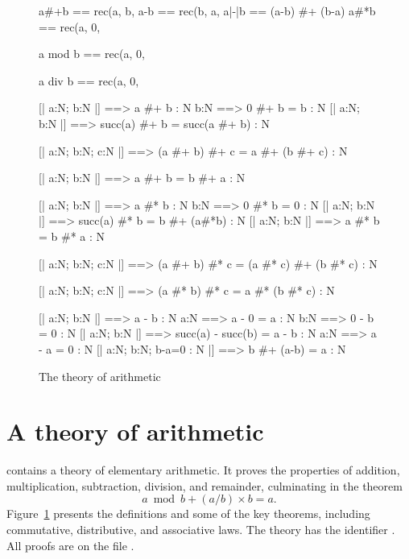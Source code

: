 \begin{figure} 
\begin{ttbox}
           a#+b  == rec(a, b, %
          a-b   == rec(b, a, %
       a|-|b == (a-b) #+ (b-a)  
          a#*b  == rec(a, 0, %

   a mod b == rec(a, 0,

   a div b == rec(a, 0,
\end{ttbox}

\begin{ttbox}
        [| a:N;  b:N |] ==> a #+ b : N
             b:N ==> 0 #+ b = b : N
         [| a:N;  b:N |] ==> succ(a) #+ b = succ(a #+ b) : N

         [| a:N;  b:N;  c:N |] ==> 
                  (a #+ b) #+ c = a #+ (b #+ c) : N

       [| a:N;  b:N |] ==> a #+ b = b #+ a : N

       [| a:N;  b:N |] ==> a #* b : N
            b:N ==> 0 #* b = 0 : N
        [| a:N;  b:N |] ==> succ(a) #* b = b #+ (a#*b) : N
      [| a:N;  b:N |] ==> a #* b = b #* a : N

     [| a:N;  b:N;  c:N |] ==> 
                  (a #+ b) #* c = (a #* c) #+ (b #* c) : N

        [| a:N;  b:N;  c:N |] ==> 
                  (a #* b) #* c = a #* (b #* c) : N

       [| a:N;  b:N |] ==> a - b : N
            a:N ==> a - 0 = a : N
       b:N ==> 0 - b = 0 : N
    [| a:N;  b:N |] ==> succ(a) - succ(b) = a - b : N
    a:N ==> a - a = 0 : N
  [| a:N;  b:N;  b-a=0 : N |] ==> b #+ (a-b) = a : N
\end{ttbox}
\caption{The theory of arithmetic} \label{ctt-arith}
\end{figure}


\section{A theory of arithmetic}
{\CTT} contains a theory of elementary arithmetic.  It proves the
properties of addition, multiplication, subtraction, division, and
remainder, culminating in the theorem
\[ a \bmod b + (a/b)\times b = a. \]
Figure~\ref{ctt-arith} presents the definitions and some of the key
theorems, including commutative, distributive, and associative laws.  The
theory has the {\ML} identifier .  All proofs are on
the file .

